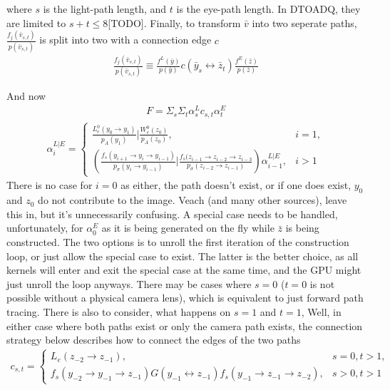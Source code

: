 \message{ !name(test.tex)}\documentclass{article}
\begin{document}
    where $s$ is the light-path length, and $t$ is the eye-path length. In
    DTOADQ, they are limited to $s+t \leq 8$[TODO]. Finally, to transform
    $\bar{v}$ into two seperate paths, $\frac{f_j(\bar{v}_{s,
        t})}{p(\bar{v}_{s, t})}$ is split into two with a connection edge $c$
  \begin{align}
    \frac{f_j(\bar{v}_{s, t})}{p(\bar{v}_{s, t})} \equiv
    \frac{f^L(\bar{y})}{p(\bar{y})} c(\bar{y}_s \leftrightarrow \bar{z}_t)
    \frac{f^E(\bar{z})}{p(\bar{z})}  
  \end{align}

    And now
  \begin{align}
    F = \Sigma_s\Sigma_t \alpha^L_s c_{s, t} \alpha^E_t
  \end{align}
  \begin{align}
    \alpha^{L|E}_i =
    \begin{cases}
      \frac{L_e^0(y_0 \rightarrow y_1)}{p_A(y_1)} | \frac{W^0_e(z_0)}{p_A(z_0)},
      &i = 1,\\
      (\frac{f_s(y_{i+1} \rightarrow y_i \rightarrow y_{i-1})}{p_{\sigma}(y_i
      \rightarrow y_{i-1})} | \frac{f_s(z_{i-1} \rightarrow z_{i-2} \rightarrow
      z_{i-3}}{p_\sigma(z_{i-2} \rightarrow z_{i-1})}) \alpha^{L|E}_{i-1},
      &i > 1
    \end{cases}
  \end{align}
    There is no case for $i = 0$ as either, the path doesn't exist, or if one
    does exist, $y_0$ and $z_0$ do not contribute to the image. Veach (and many other
    sources), leave this in, but it's unnecessarily confusing. A special case
    needs to be handled, unfortunately, for $\alpha^E_0$ as it is being
    generated on the fly while $\bar{z}$ is being constructed. The two options
    is to unroll the first iteration of the construction loop, or just allow the
    special case to exist. The latter is the better choice, as all kernels will
    enter and exit the special case at the same time, and the GPU might just
    unroll the loop anyways.
    There may be cases where $s = 0$ ($t = 0$ is not possible without a
    physical camera lens), which is equivalent to just forward path tracing.
    There is also to consider, what happens on $s = 1$ and $t = 1$, %
    Well, in either case where both paths exist or only the camera path exists,
    the connection strategy below describes how to connect the edges of the two
    paths
  \begin{align}
    c_{s, t} =
    \begin{cases}
      L_e(z_{-2} \rightarrow z_{-1}), &s = 0, t > 1,\\
      f_s(y_{-2} \rightarrow y_{-1} \rightarrow z_{-1}) G(y_{-1} \leftrightarrow
      z_{-1}) f_s(y_{-1} \rightarrow z_{-1} \rightarrow z_{-2}), &s > 0, t > 1
    \end{cases}
  \end{align}
\end{document}
